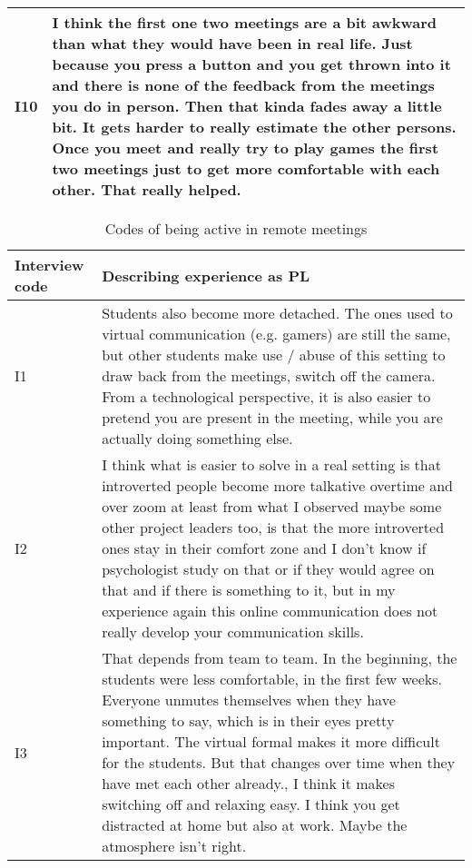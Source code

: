 \begin{longtable}{|  p{}  |  p{} |}
  \\
\hline
\vspace{-0.5cm} I10 & 
  I think the first one two meetings are a bit awkward than what they would have been in real life. Just because you press a button and you get thrown into it and there is none of the feedback from the meetings you do in person. Then that kinda fades away a little bit. It gets harder to really estimate the other persons. Once you meet and really try to play games the first two meetings just to get more comfortable with each other. That really helped.
     \\
\hline
\end{longtable}

\begin{longtable}{|  p{}  |  p{} |}
\caption{Codes of being active in remote meetings}
\label{tab:table4}\\
\hline
\textbf{Interview code} & \textbf{Describing experience as PL} \\
\hline
\vspace{-0.5cm} I1 & 
Students also become more detached. The ones used to virtual communication (e.g. gamers) are still the same, but other students make use / abuse of this setting to draw back from the meetings, switch off the camera. From a technological perspective, it is also easier to pretend you are present in the meeting, while you are actually doing something else. \\
\hline
\vspace{-0.5cm} I2 &
 I think what is easier to solve in a real setting is that introverted people become more talkative overtime and over zoom at least from what I observed maybe some other project leaders too, is that the more introverted ones stay in their comfort zone and I don't know if psychologist study on that or if they would agree on that and if there is something to it, but in my experience again this online communication does not really develop your communication skills.
 \\
\hline
\vspace{-0.5cm} I3 & 
 That depends from team to team. In the beginning, the students were less comfortable, in the first few weeks. Everyone unmutes themselves when they have something to say, which is in their eyes pretty important. The virtual formal makes it more difficult for the students. But that changes over time when they have met each other already., I think it makes switching off and relaxing easy. I think you get distracted at home but also at work. Maybe the atmosphere isn't right.

\end{longtable}
